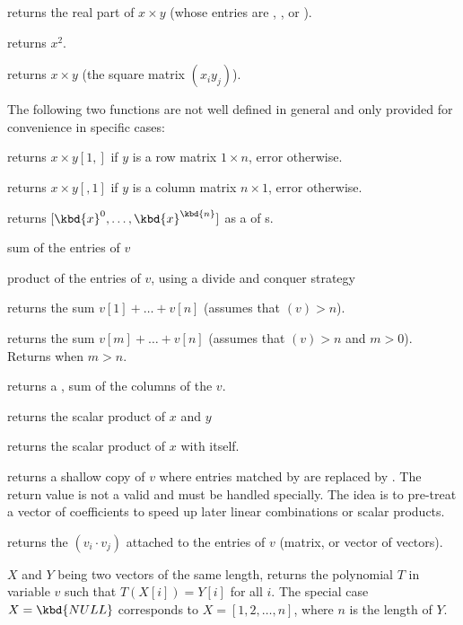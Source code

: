  returns the real part of $x\times y$
(whose entries are , ,  or ).

 returns $x^2$.

 returns $x\times y$ (the square matrix
$(x_iy_j)$).

The following two functions are not well defined in general and only provided
for convenience in specific cases:

 returns $x\times y[1,]$ if $y$ is
a row matrix $1\times n$, error otherwise.

 returns $x\times y[,1]$ if $y$ is
a column matrix $n\times 1$, error otherwise.

 returns $[\kbd{x}^0,
\dots, \kbd{x}^\kbd{n}]$ as a  of s.

\smallskip

 sum of the entries of $v$

 product of the entries of $v$, using
a divide and conquer strategy

 returns the sum $v[1] + \dots + v[n]$
(assumes that $(v) > n$).

 returns the sum $v[m] + \dots +
v[n]$ (assumes that $(v) > n$ and $m > 0$). Returns 
when $m > n$.

 returns a , sum of the columns of the
 $v$.

 returns the scalar product of $x$ and $y$

 returns the scalar product of $x$ with itself.

 returns a shallow copy of $v$ where entries
matched by  are replaced by . The return value
is not a valid  and must be handled specially. The idea is
to pre-treat a vector of coefficients to speed up later linear combinations
or scalar products.

 returns the  $(v_i\cdot v_j)$
attached to the entries of $v$ (matrix, or vector of vectors).

 $X$ and $Y$ being two vectors of
the same length, returns the polynomial $T$ in variable $v$ such that
$T(X[i]) = Y[i]$ for all $i$. The special case $X = \kbd{NULL}$
corresponds to $X = [1,2,\dots,n]$, where $n$ is the length of $Y$.

